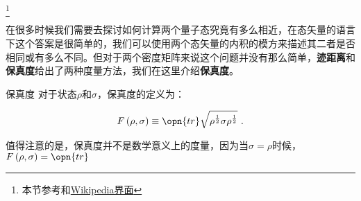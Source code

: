 
\footnote{本节参考\cite{量子信息}和\href{https://en.wikipedia.org/wiki/Trace_distance}{Wikipedia界面}}

在很多时候我们需要去探讨如何计算两个量子态究竟有多么相近，在态矢量的语言下这个答案是很简单的，我们可以使用两个态矢量的内积的模方来描述其二者是否相同或有多么不同。但对于两个密度矩阵来说这个问题并没有那么简单，\textbf{迹距离}和\textbf{保真度}给出了两种度量方法，我们在这里介绍\textbf{保真度}。

\begin{definition}{保真度}
对于状态$\rho$和$\sigma$，保真度的定义为：

\begin{equation}
F\left(\rho, \sigma\right)\equiv\opn{tr}\sqrt{\rho^{\frac{1}{2}}\sigma\rho^{\frac{1}{2}}}~.
\end{equation}

\end{definition}

值得注意的是，保真度并不是数学意义上的度量，因为当$\sigma = \rho$时候，$F\left(\rho, \sigma\right) = \opn{tr}$
